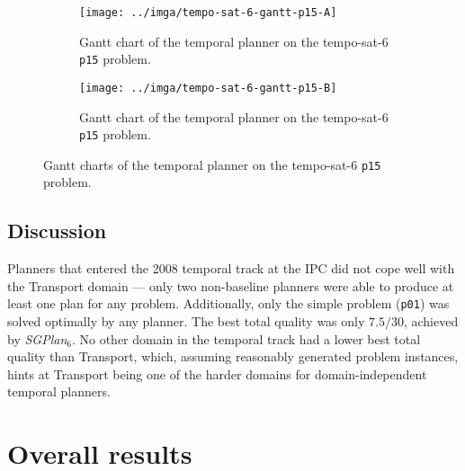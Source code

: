 \begin{figure}
\centering
\begin{subfigure}{\textwidth}
\centering
\texttt{[image: ../imga/tempo-sat-6-gantt-p15-A]}
\caption{Gantt chart of the temporal planner  on the tempo-sat-6 \texttt{p15} problem.}
\label{fig:tempo-sat-6-gantt-15-a}
\end{subfigure}

\begin{subfigure}{\textwidth}
\centering
\texttt{[image: ../imga/tempo-sat-6-gantt-p15-B]}
\caption{Gantt chart of the temporal planner  on the tempo-sat-6 \texttt{p15} problem.}
\label{fig:tempo-sat-6-gantt-15-b}
\end{subfigure}
\caption{Gantt charts of the temporal planner  on the tempo-sat-6 \texttt{p15} problem.}
\label{fig:tempo-sat-6-gantt}
\end{figure}

\subsection{Discussion}

Planners that entered the 2008 temporal track at the IPC did not cope well with the Transport domain
--- only two non-baseline planners were able to produce at least one plan
for any problem. Additionally, only the simple problem (\verb+p01+) was solved
optimally by any planner. The best total quality was only $7.5/30$, achieved by
\textit{SGPlan$_6$}. No other domain in the temporal track had a lower best total quality
than Transport, which, assuming reasonably generated problem instances, hints
at Transport being one of the harder domains for domain-independent temporal planners.




\section{Overall results}

